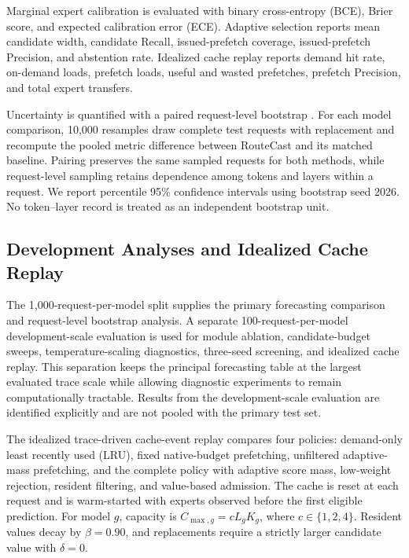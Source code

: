 \documentclass[conference]{IEEEtran}
\begin{document}
Marginal expert calibration is evaluated with binary cross-entropy (BCE),
Brier score, and expected calibration error (ECE). Adaptive selection reports mean candidate
width, candidate Recall, issued-prefetch coverage, issued-prefetch Precision,
and abstention rate. Idealized cache replay reports demand hit rate, on-demand loads,
prefetch loads, useful and wasted prefetches, prefetch Precision, and total
expert transfers.

Uncertainty is quantified with a paired request-level bootstrap
\cite{efron1993}. For each
model comparison, 10,000 resamples draw complete test requests with replacement
and recompute the pooled metric difference between RouteCast and its matched
baseline. Pairing preserves the same sampled requests for both methods, while
request-level sampling retains dependence among tokens and layers within a
request. We report percentile 95\% confidence intervals using bootstrap seed
2026. No token--layer record is treated as an independent bootstrap unit.

\subsection{Development Analyses and Idealized Cache Replay}

The 1,000-request-per-model split supplies the primary forecasting comparison
and request-level bootstrap analysis. A separate 100-request-per-model
development-scale evaluation is used for module ablation, candidate-budget sweeps,
temperature-scaling diagnostics, three-seed screening, and idealized cache replay. This
separation keeps the principal forecasting table at the largest evaluated
trace scale while allowing diagnostic experiments to remain computationally
tractable. Results from the development-scale evaluation are identified explicitly and
are not pooled with the primary test set.

The idealized trace-driven cache-event replay compares four policies:
demand-only least recently used
(LRU), fixed native-budget prefetching, unfiltered adaptive-mass prefetching,
and the complete policy with adaptive score mass, low-weight rejection, resident
filtering, and value-based admission. The cache is reset at each request and
is warm-started with experts observed before the first eligible prediction.
For model \(g\), capacity is
\(C_{\max,g}=cL_gK_g\), where
\(c\in\{1,2,4\}\). Resident values decay by \(\beta=0.90\), and replacements
require a strictly larger candidate value with \(\delta=0\).
\end{document}
